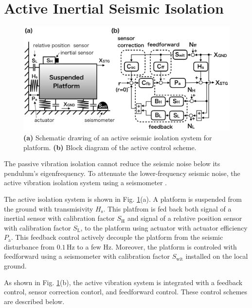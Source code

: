 \section{Active Inertial Seismic Isolation}\label{sec:512}
\begin{figure}[h]
  \begin{center}
    \includegraphics[width=13.5cm]{./img_chap5/img503.png}
    \caption{{\bf(a)} Schematic drawing of an active seismic isolation system for platform. {\bf(b)} Block diagram of the active control scheme.} \label{img:img503}
  \end{center}
\end{figure}
The passive vibration isolation cannot reduce the seismic noise below its pendulum's eigenfrequency. To attenuate the lower-frequency seismic noise, the active vibration isolation system using a seismometer \cite{matichard2015seismic}.

The active isolation system is shown in Fig. \ref{img:img503}(a). A platform is suspended from the ground with transmisivity $H_{\mathrm{s}}$. This platfrom is fed back both signal of a inertial sensor with calibration factor $S_{\mathrm{H}}$ and signal of a relative position sensor with calibration factor $S_{\mathrm{L}}$, to the platform using actuator with actuator efficiency $P_{\mathrm{a}}$. This feedback control actively decouple the platform from the seismic disturbance from $0.1\,\mathrm{Hz}$ to a few Hz. Moreover, the platform is controled with feedforward using a seismometer with calibration factor $S_{\mathrm{wit}}$ installed on the local ground. 

As shown in Fig. \ref{img:img503}(b), the active vibration system is integrated with a feedback control, sensor correction contorl, and feedforward control. These control schemes are described below.

